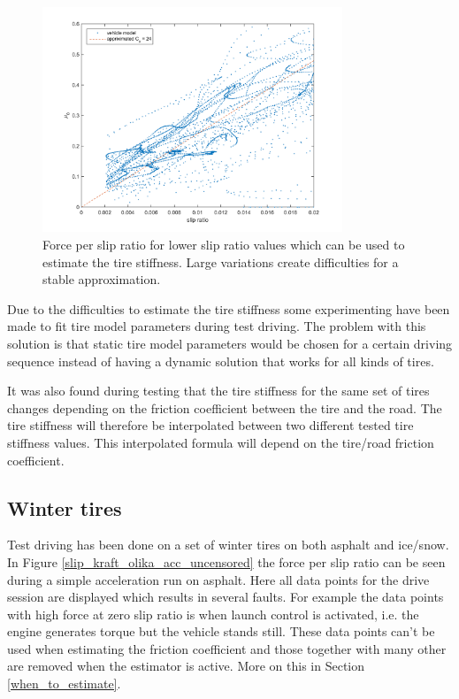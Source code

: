 \begin{figure}[h]
	\centering
	\includegraphics[width=0.8\textwidth]{Pictures/slip_kraft_sma_slip}
	\caption {Force per slip ratio for lower slip ratio values which can be used to estimate the tire stiffness. Large variations create difficulties for a stable approximation.}
	\label{slip_kraft_sma_slip}
\end{figure}

Due to the difficulties to estimate the tire stiffness some experimenting have been made to fit tire model parameters during test driving. The problem with this solution is that static tire model parameters would be chosen for a certain driving sequence instead of having a dynamic solution that works for all kinds of tires. 

It was also found during testing that the tire stiffness for the same set of tires changes depending on the friction coefficient between the tire and the road. The tire stiffness will therefore be interpolated between two different tested tire stiffness values. This interpolated formula will depend on the tire/road friction coefficient. 

\subsection{Winter tires}
\label{winter_tire}
Test driving has been done on a set of winter tires on both asphalt and ice/snow. In Figure \ref{slip_kraft_olika_acc_uncensored} the force per slip ratio can be seen during a simple acceleration run on asphalt. Here all data points for the drive session are displayed which results in several faults. For example the data points with high force at zero slip ratio is when launch control is activated, i.e. the engine generates torque but the vehicle stands still. These data points can't be used when estimating the friction coefficient and those together with many other are removed when the estimator is active. More on this in Section \ref{when_to_estimate}.   

